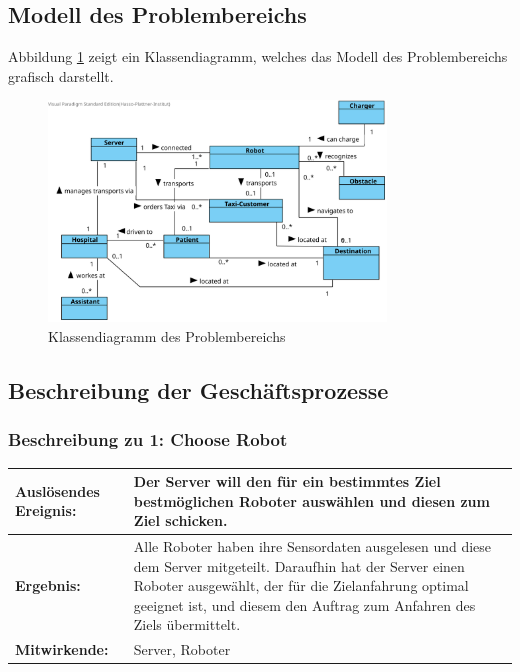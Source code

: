 		\subsection{Modell des Problembereichs}
		Abbildung \ref{fig:2-3-modell-problembereich} zeigt ein Klassendiagramm, welches das Modell des Problembereichs grafisch darstellt.
		\begin{figure}[H]
			\centering
			\includegraphics[width=0.8\textwidth]{img/1-Analyse-2}
			\caption{Klassendiagramm des Problembereichs}
			\label{fig:2-3-modell-problembereich}
		\end{figure}

		\subsection{Beschreibung der Geschäftsprozesse}

			\subsubsection*{Beschreibung zu 1: Choose Robot}

			\begin{table}[H]
				\centering
				\begin{tabularx}{\textwidth}{|p{3cm}|X|}
				\hline
				\textbf{Auslösendes Ereignis:} & Der Server will den für ein bestimmtes Ziel bestmöglichen Roboter auswählen und diesen zum Ziel schicken. \\ \hline
				\textbf{Ergebnis:} & Alle Roboter haben ihre Sensordaten ausgelesen und diese dem Server
				mitgeteilt. 
				Daraufhin hat der Server einen Roboter ausgewählt, der für
				die Zielanfahrung optimal geeignet ist, und diesem den Auftrag zum
				Anfahren des Ziels übermittelt. \\ \hline
				\textbf{Mitwirkende:} &	Server, Roboter \\
				\hline
				\end{tabularx}
				\label{tab:2-4-choose-robot}
			\end{table}

